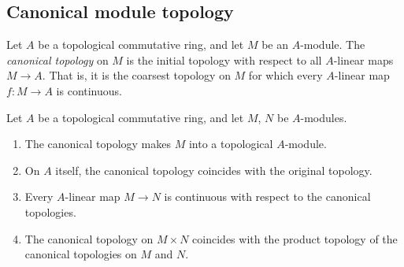 \subsection{Canonical module topology}

\begin{definition}
  \label{def:canonical_topology}
  \leanok
  Let $A$ be a topological commutative ring, and let $M$ be an $A$-module.
  The \emph{canonical topology} on $M$ is the initial topology with respect to
  all $A$-linear maps $M \to A$. That is, it is the coarsest topology on $M$
  for which every $A$-linear map $f \colon M \to A$ is continuous.
\end{definition}

\begin{theorem}
  \label{thm:canonical_topology_properties}
  \leanok
  Let $A$ be a topological commutative ring, and let $M$, $N$ be $A$-modules.
  \begin{enumerate}
    \item The canonical topology makes $M$ into a topological $A$-module.
    \item On $A$ itself, the canonical topology coincides with the original
      topology.
    \item Every $A$-linear map $M \to N$ is continuous with respect to the
      canonical topologies.
    \item The canonical topology on $M \times N$ coincides with the product
      topology of the canonical topologies on $M$ and $N$.
  \end{enumerate}
\end{theorem}

